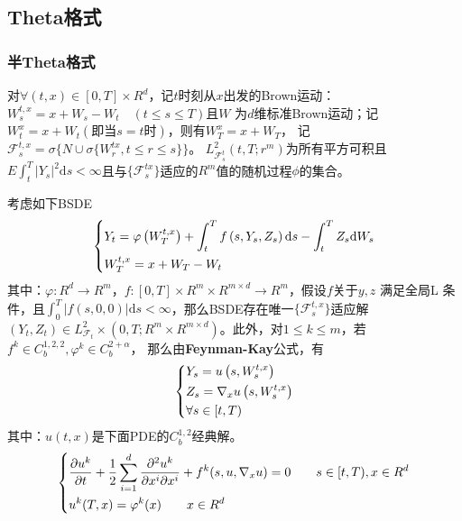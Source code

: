 	\subsection{Theta格式}
		\subsubsection{半Theta格式}
			对$\forall(t,x) \in [0,T]\times R^d$，记$t$时刻从$x$出发的Brown运动：$W_{s}^{t,x}=x+W_s-W_t \quad (t\leq s\leq T)$且$W$ 为$d$维标准Brown运动；记$W_t^x=x+W_t (\text{即当}s=t \text{时})$，则有$W_T^x=x+W_T$，
			记${{\mathcal{F}}_s^{t,x}}=\sigma\{ N\cup  \sigma\{W_r^{tx},t\leq r \leq s \} \}$。
			${L_{{\mathcal{F}}_s^t}^2}(t,T;r^m)$为所有平方可积且$E\int_t^T {{{\left| {{Y_s}} \right|}^2}\mathrm{d}s < \infty } $且与$\{{\mathcal{F}}_s^{tx}\}$适应的$R^m$值的随机过程$\phi$的集合。
			\par
			考虑如下BSDE
					\begin{equation*}
					\centering
					\left\{\begin{lgathered}
					{{Y_t} = \varphi \left( {W_T^{t,x}} \right) + \int_t^T {f\left( {s,{Y_s},{Z_s}} \right)\mathrm{d}s - \int_t^T {{Z_s}\mathrm{d}{W_s}} } }\\
					{W_T^{t,x} = x + {W_T} - {W_t}}
					\end{lgathered} \right.
					\end{equation*}
			其中：$\varphi:R^d\rightarrow R^m$，$f:[0,T] \times R^m \times R^{m\times d}\rightarrow R^m$，假设$f$关于$y,z$ 满足全局L 条件，且$\int_0^T {\left| {f\left( {s,0,0} \right)} \right|\mathrm{d}s < \infty } $，那么BSDE存在唯一$\{{\mathcal{F}}_s^{t,x}\}$适应解$( {{Y_t},{Z_t}} ) \in L_{{\mathcal{F}_t}}^2 \times ( {0,T;{R^m} \times {R^{m \times d}}} )$。此外，对$1 \leqslant k \leqslant m$，若${f^k} \in C_b^{1,2,2},{\varphi ^k} \in C_b^{2 + \alpha }$，
			 那么由\textbf{Feynman-Kay}公式，有
					\begin{equation*}
					\centering
					\left\{\begin{lgathered}
					{{Y_s} = u\left( {s,W_s^{t,x}} \right)}\\
					{{Z_s} = {\nabla _x}u\left( {s,W_s^{t,x}} \right)}\\
					{\forall s \in \left[ {t,T} \right)}
					\end{lgathered} \right.
					\end{equation*}
			其中：$u(t,x)$是下面PDE的$C_b^{1,2}$经典解。
					\begin{equation*}
					\left\{\begin{lgathered}
					{\frac{{\partial {u^k}}}{{\partial t}} + \frac{1}{2}\sum\limits_{i = 1}^d {\frac{{{\partial ^2}{u^k}}}{{\partial {x^i}\partial {x^i}}}}  + {f^k}( {s,u,{\nabla _x}u} ) = 0}  \qquad  {s \in [ {t,T} ),x \in {R^d}}\\
					{{u^k}( {T,x} ) = {\varphi ^k}( x )}  \qquad {x \in {R^d}}
					\end{lgathered} \right.
					\end{equation*}
